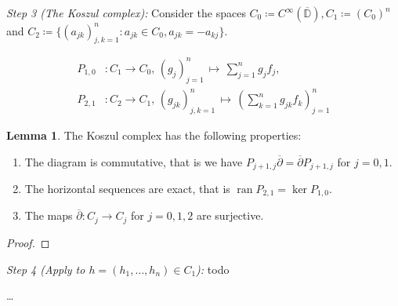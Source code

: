 \documentclass[letterpaper, 11pt]{article}
\newcommand{\D}{\mathbb{D}}
\newcommand{\1}{\mathds{1}}
\DeclareMathOperator*{\ran}{ran}
\theoremstyle{definition}
\newtheorem{lemma}[theorem]{Lemma}
\newenvironment{innerproof}
 {\renewcommand{\qedsymbol}{}\proof}
 {\endproof}
\begin{document}
\begin{innerproof}
  \textit{Step 3 (The Koszul complex):} Consider the spaces $C_0 \coloneqq C^\infty(\overline{\D}), C_1 \coloneqq (C_0)^n$ and $C_2 \coloneqq \{ (a_{jk})_{j,k=1}^n : a_{jk} \in C_0, a_{jk} = -a_{kj} \}$.


  \begin{align*}
    P_{1,0} &: C_1 \to C_0,\, (g_j)_{j=1}^n \,\mapsto\, \sum_{j=1}^n g_j f_j, \\
    P_{2,1} &: C_2 \to C_1,\, (g_{jk})_{j,k=1}^n \,\mapsto\, \left( \sum_{k=1}^n g_{jk} f_k \right)_{j=1}^n
  \end{align*}

  \begin{center}
  \end{center}

\end{innerproof}

\begin{lemma}
  The Koszul complex has the following properties:
  \begin{enumerate}
    \item The diagram is commutative, that is we have $P_{j+1,j} \overline{\partial} = \overline{\partial} P_{j+1,j}$ for $j = 0,1$.
    \item The horizontal sequences are exact, that is $\ran P_{2,1} = \ker P_{1,0}$.
    \item The maps $\overline{\partial} : C_j \to C_j$ for $j=0,1,2$ are surjective.
  \end{enumerate}
\end{lemma}

\begin{proof}
  \lipsum[1]
\end{proof}

\begin{innerproof}[Proof (continued)]
  \textit{Step 4 (Apply to $h = (h_1, \dots, h_n) \in C_1$):} todo

  \dots

  
\end{innerproof}
\end{document}
